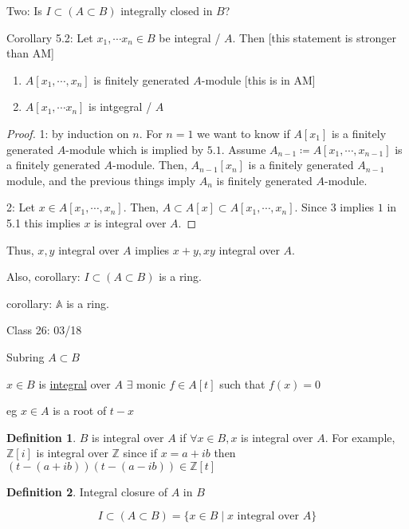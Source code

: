 \documentclass{article}
\theoremstyle{definition}
\newtheorem{definition}{Definition}
\begin{document}
Two: Is \(I \subset (A \subset B)\) integrally closed in \(B\)?

Corollary 5.2: Let \(x_1,\cdots x_n\in B\) be integral / \(A\). Then [this statement is stronger than AM]

\begin{enumerate}
    \item \(A[x_1,\cdots, x_n]\) is finitely generated \(A\)-module [this is in AM]
    \item \(A[x_1,\cdots x_n]\) is intgegral / \(A\)
\end{enumerate}

\begin{proof}
    1: by induction on \(n\). For \(n = 1\) we want to know if \(A[x_1]\) is a finitely generated \(A\)-module which is implied by \(5.1\). Assume \(A_{n-1} \coloneqq A[x_1,\cdots, x_{n-1}]\) is a finitely generated \(A\)-module. Then, \(A_{n-1}[x_n]\) is a finitely generated \(A_{n-1}\) module, and the previous things imply \(A_n\) is finitely generated \(A\)-module.
    
    2: Let \(x\in A[x_1,\cdots,x_n]\). Then, \(A \subset A[x] \subset A[x_1,\cdots, x_n]\). Since \(3\) implies \(1\) in 5.1 this implies \(x\) is integral over \(A\).
\end{proof}

Thus, \(x,y\) integral over \(A\) implies \(x+y,xy\) integral over \(A\).

Also, corollary: \(I \subset (A \subset B)\) is a ring.

corollary: \(\mathbb{A}\) is a ring.

\hrulefill

Class 26: 03/18

Subring \(A \subset B\) 

\(x \in B\) is \underline{integral} over \(A\) \(\exists\) monic \(f\in A[t]\) such that \(f(x)=0\) 

eg \(x\in A\) is a root of \(t - x\) 

\begin{definition}
    \(B\) is integral over \(A\) if \(\forall x\in B, x\) is integral over \(A\). For example, \(\mathbb{Z} [i]\) is integral over \(\mathbb{Z}\) since if \(x=a+ib\) then \((t-(a+ib))(t-(a-ib))\in\mathbb{Z} [t]\)     
\end{definition}

\begin{definition}
    Integral closure of \(A\) in \(B\) 

    \[
        I \subset (A \subset B) = \{ x\in B\mid x \text{ integral over } A \} 
    \]
\end{definition}
\end{document}
